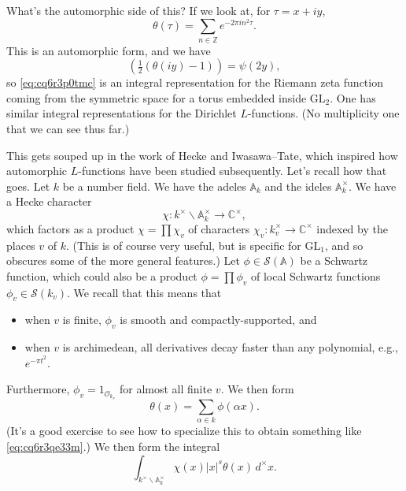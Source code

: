 \documentclass[reqno]{amsart} 
\begin{document}
What's the automorphic side of this?  If we look at, for $\tau = x + i y$,
\begin{equation*}
  \theta(\tau) = \sum_{n \in \mathbb{Z}} e^{- 2 \pi i n^2 \tau}.
\end{equation*}
This is an automorphic form, and we have
\begin{equation*}
  (\tfrac{1}{2}(\theta(i y) - 1)) = \psi(2 y),
\end{equation*}
so \eqref{eq:cq6r3p0tmc} is an integral representation for the Riemann zeta function coming from the symmetric space for a torus embedded inside $\mathrm{GL}_2$.  One has similar integral representations for the Dirichlet $L$-functions.  (No multiplicity one that we can see thus far.)

This gets souped up in the work of Hecke and Iwasawa--Tate, which inspired how automorphic $L$-functions have been studied subsequently.  Let's recall how that goes.  Let $k$ be a number field.  We have the adeles $\mathbb{A}_k$ and the ideles $\mathbb{A}_k^\times$.  We have a Hecke character
\begin{equation*}
  \chi : k^\times \backslash \mathbb{A}_k^\times \rightarrow \mathbb{C}^\times,
\end{equation*}
which factors as a product $\chi = \prod \chi_v$ of characters $\chi_v : k_v^\times \rightarrow \mathbb{C}^\times$ indexed by the places $v$ of $k$.  (This is of course very useful, but is specific for $\mathrm{GL}_1$, and so obscures some of the more general features.)  Let $\phi \in \mathcal{S}(\mathbb{A})$ be a Schwartz function, which could also be a product $\phi = \prod \phi_v$ of local Schwartz functions $\phi_v \in \mathcal{S}(k_v)$.  We recall that this means that
\begin{itemize}
\item when $v$ is finite, $\phi_v$ is smooth and compactly-supported, and
\item when $v$ is archimedean, all derivatives decay faster than any polynomial, e.g., $e^{- \pi t^2}$.
\end{itemize}
Furthermore, $\phi_v = 1_{\mathcal{O}_{k_v}}$ for almost all finite $v$.  We then form
\begin{equation*}
  \theta(x) = \sum_{\alpha \in k} \phi(\alpha x).
\end{equation*}
(It's a good exercise to see how to specialize this to obtain something like \eqref{eq:cq6r3qe33m}.)  We then form the integral
\begin{equation*}
  \int_{k^\times \backslash \mathbb{A}_k^\times} \chi(x) \lvert x \rvert^s \theta(x) \,d^\times x.
\end{equation*}
\end{document}
